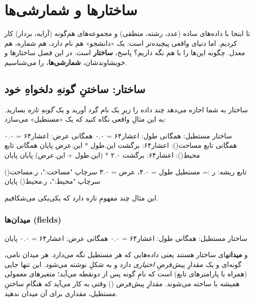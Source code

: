\chapter{ساختارها و شمارشی‌ها}%
\label{ch:structs}

تا اینجا با داده‌های ساده (عدد، رشته، منطقی) و مجموعه‌های هم‌گونه (آرایه، بردار)
کار کردیم. اما دنیای واقعی پیچیده‌تر است: یک «دانشجو» هم نام دارد، هم شماره، هم
معدل. چگونه این‌ها را با هم نگه داریم؟ پاسخ، \textbf{ساختار} است. در این فصل
ساختارها و خویشاوندشان، \textbf{شمارشی‌ها}، را می‌شناسیم.

\section{ساختار: ساختنِ گونهِ دلخواهِ خود}

ساختار به شما اجازه می‌دهد چند داده را زیرِ یک نام گرد آورید و یک \emph{گونهِ
تازه} بسازید. به این مثالِ واقعی نگاه کنید که یک «مستطیل» می‌سازد:

\begin{salamfa}
ساختار مستطیل:
    همگانی طول: اعشار۶۴ = ۰.۰
    همگانی عرض: اعشار۶۴ = ۰.۰
    همگانی تابع مساحت(): اعشار۶۴:
        برگشت این.طول * این.عرض
    پایان
    همگانی تابع محیط(): اعشار۶۴:
        برگشت ۲.۰ * (این.طول + این.عرض)
    پایان
پایان

تابع ریشه:
    ر := مستطیل { طول = ۴.۰، عرض = ۳.۰ }
    سرچاپ "مساحت:"، ر.مساحت()
    سرچاپ "محیط:"، ر.محیط()
پایان
\end{salamfa}

این مثال چند مفهومِ تازه دارد که یکی‌یکی می‌شکافیم.

\subsection{میدان‌ها (fields)}

\begin{salamfa}
ساختار مستطیل:
    همگانی طول: اعشار۶۴ = ۰.۰
    همگانی عرض: اعشار۶۴ = ۰.۰
پایان
\end{salamfa}

 و  \textbf{میدان}های ساختار هستند یعنی داده‌هایی که هر
مستطیل نگه می‌دارد. هر میدان نامی، گونه‌ای و یک مقدارِ پیش‌فرضِ \emph{اختیاری} دارد
و به شکلِ  نوشته می‌شود. این تنها جایی (همراه با
پارامترهای تابع) است که نامِ گونه پس از دونقطه می‌آید؛ متغیرهای معمولی همیشه با
\code{:=} ساخته می‌شوند. مقدارِ پیش‌فرض () وقتی به کار می‌آید که
هنگامِ ساختنِ مستطیل، مقداری برای آن میدان ندهید.


